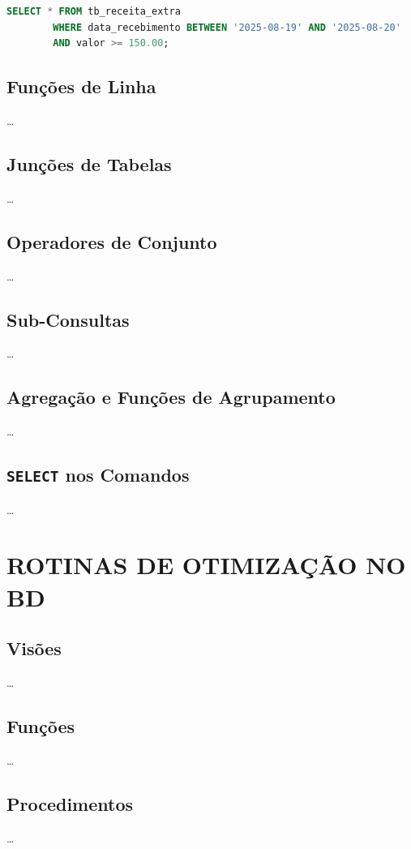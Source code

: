\documentclass[
12pt,
a4paper,
semrecuonosumario,
sumario = abnt-6027-2012]{report}
\begin{document}
    \begin{lstlisting}[language=SQL,caption={SELECT -- Tabela \texttt{tb\_receita\_extra}}]
        SELECT * FROM tb_receita_extra
        WHERE data_recebimento BETWEEN '2025-08-19' AND '2025-08-20'
        AND valor >= 150.00;
    \end{lstlisting}
    
    \section{Funções de Linha}
    \dots
    
    \section{Junções de Tabelas}
    \dots
    
    \section{Operadores de Conjunto}
    \dots
    
    \section{Sub-Consultas}
    \dots
    
    \section{Agregação e Funções de Agrupamento}
    \dots
    
    \section{\texttt{SELECT} nos Comandos}
    \dots

\chapter{ROTINAS DE OTIMIZAÇÃO NO BD}\label{chap:otimizacao}
    \section{Visões}
    \dots
    
    \section{Funções}
    \dots
    
    \section{Procedimentos}
    \dots
    
\end{document}

